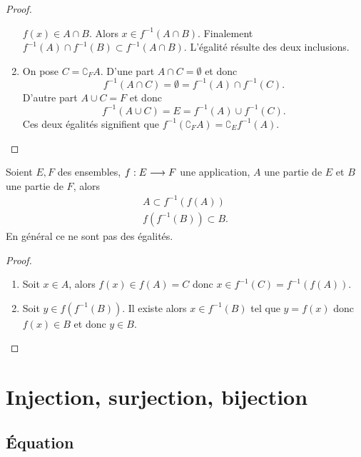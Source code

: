\begin{proof}
\begin{enumerate}
            \(f(x) \in A \cap B\). Alors \(x \in f^{-1}(A \cap B)\). Finalement 
            \(f^{-1}(A) \cap f^{-1}(B) \subset f^{-1}(A \cap B)\). L'égalité 
            résulte des deux inclusions.
        \item On pose \(C=\complement_F A\). D'une part \(A \cap C =\emptyset\) 
            et donc
            \begin{equation}
                f^{-1}(A \cap C)=\emptyset=f^{-1}(A) \cap f^{-1}(C).
            \end{equation}
            D'autre part \(A \cup C =F\) et donc
            \begin{equation}
                f^{-1}(A \cup C) = E = f^{-1}(A) \cup f^{-1}(C).
            \end{equation}
            Ces deux égalités signifient que \(f^{-1}(\complement_F A) = 
            \complement_E f^{-1}(A)\). 
    \end{enumerate}
\end{proof}

\begin{prop}
    Soient \(E,F\) des ensembles, \(f:E \longrightarrow F\) une application, \(A\) 
    une partie de \(E\) et \(B\) une partie de \(F\), alors
    \begin{gather}
        A \subset f^{-1}(f(A)) \\
        f(f^{-1}(B)) \subset B.
    \end{gather}
    En général ce ne sont pas des égalités.
\end{prop}

\begin{proof}
    \begin{enumerate}
        \item Soit \(x \in A\), alors \(f(x) \in f(A) = C\) donc \(x \in 
            f^{-1}(C)=f^{-1}(f(A))\).
        \item Soit \(y \in f(f^{-1}(B))\). Il existe alors \(x \in f^{-1}(B)\) 
            tel que \(y=f(x)\) donc \(f(x) \in B\) et donc \(y \in B\).
    \end{enumerate}
\end{proof}

\section{Injection, surjection, bijection}
\label{chap3-sec:injsurbij}

\subsection{Équation}
\label{chap3-subsec:equation}

